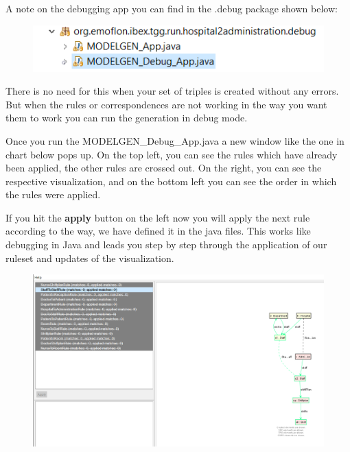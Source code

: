 A note on the debugging app you can find in the \textsf{.debug} package shown below:\newline

\begin{figure}[h]
    \centering
    \includegraphics[scale=0.65 ]{pictures/debugPackage.png}
    \caption{}
    \label{setDefaultNumber}
\end{figure}

There is no need for this when your set of triples is created without any errors. But when the rules or correspondences are not working in the way you want them to work you can run the generation in debug mode.

Once you run the \textsf{MODELGEN\_Debug\_App.java} a new window like the one in chart below pops up. On the top left, you can see the rules which have already been applied, the other rules are crossed out. On the right, you can see the respective visualization, and on the bottom left you can see the order in which the rules were applied. \newline

If you hit the \textbf{apply} button on the left now you will apply the next rule according to the way, we have defined it in the java files. This works like debugging in Java and leads you step by step through the application of our ruleset and updates of the visualization.

\begin{figure}[h]
    \centering
    \includegraphics[scale=0.4 ]{pictures/debugWindow.png}
    \caption{}
    \label{setDefaultNumber}
\end{figure}


\clearpage